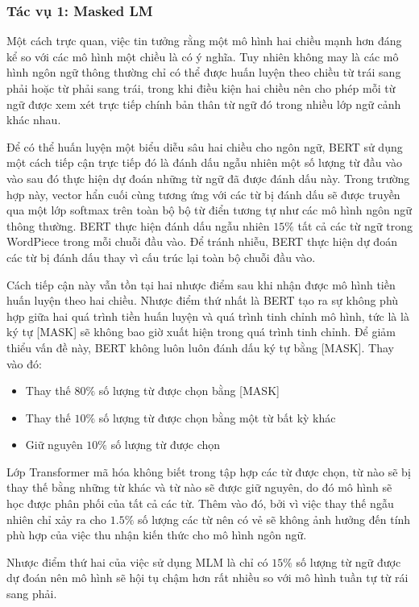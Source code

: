 \documentclass[14pt]{extreport}
\begin{document}
\subsubsection{Tác vụ 1: Masked LM}
Một cách trực quan, việc tin tưởng rằng một mô hình hai chiều mạnh hơn đáng kể so với các mô hình một chiều là có ý nghĩa. Tuy nhiên không may là các mô hình ngôn ngữ thông thường chỉ có thể được huấn luyện theo chiều từ trái sang phải hoặc từ phải sang trái, trong khi điều kiện hai chiều nên cho phép mỗi từ ngữ được xem xét trực tiếp chính bản thân từ ngữ đó trong nhiều lớp ngữ cảnh khác nhau.

Để có thể huấn luyện một biểu diễu sâu hai chiều cho ngôn ngữ, BERT sử dụng một cách tiếp cận trực tiếp đó là đánh dấu ngẫu nhiên một số lượng từ đầu vào vào sau đó thực hiện dự đoán những từ ngữ đã được đánh dấu này. Trong trường hợp này, vector hẩn cuối cùng tương ứng với các từ bị đánh dấu sẽ được truyền qua một lớp softmax trên toàn bộ bộ từ điển tương tự như các mô hình ngôn ngữ thông thường. BERT thực hiện đánh dấu ngẫu nhiên $15\%$ tất cả các từ ngữ trong WordPiece trong mỗi chuỗi đầu vào. Để tránh nhiễu, BERT thực hiện dự đoán các từ bị đánh dấu thay vì cấu trúc lại toàn bộ chuỗi đầu vào.

Cách tiếp cận này vẫn tồn tại hai nhược điểm sau khi nhận được  mô hình tiền huấn luyện theo hai chiều. Nhược điểm thứ nhất là BERT tạo ra sự không phù hợp giữa hai quá trình tiền huấn luyện và quá trình tinh chỉnh mô hình, tức là là ký tự [MASK] sẽ không bao giờ xuất hiện trong quá trình tinh chỉnh. Để giảm thiểu vấn đề này, BERT không luôn luôn đánh dấu ký tự bằng [MASK]. Thay vào đó:
\begin{itemize}
    \item Thay thế $80\%$ số lượng từ được chọn bằng [MASK]
    \item Thay thế $10\%$ số lượng từ được chọn bằng một từ bất kỳ khác
    \item Giữ nguyên $10\%$ số lượng từ được chọn  
\end{itemize}
Lớp Transformer mã hóa không biết trong tập hợp các từ được chọn, từ nào sẽ bị thay thế bằng những từ khác và từ nào sẽ được giữ nguyên, do đó mô hình sẽ học được phân phối của tất cả các từ. Thêm vào đó, bởi vì việc thay thế ngẫu nhiên chỉ xảy ra cho $1.5\%$ số lượng các từ nên có vẻ sẽ không ảnh hưởng đến tính phù hợp của việc thu nhận kiến thức cho mô hình ngôn ngữ.

Nhược điểm thứ hai của việc sử dụng MLM là chỉ có $15\%$ số lượng từ ngữ được dự đoán nên mô hình sẽ hội tụ chậm hơn rất nhiều so với mô hình tuần tự từ rái sang phải. 
\end{document}
